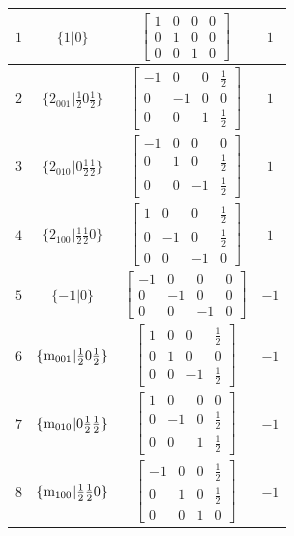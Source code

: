 \documentclass[fleqn,8pt]{jsarticle}
\begin{document}
\begin{longtable}{cccc}
$ 1 $ & $ \{1|0\} $ & $ \begin{bmatrix} 1 & 0 & 0 & 0 \\ 0 & 1 & 0 & 0 \\ 0 & 0 & 1 & 0 \end{bmatrix} $ & $ 1 $ \\ \hline
$ 2 $ & $ \{2{}_{001}|\frac{1}{2} 0 \frac{1}{2}\} $ & $ \begin{bmatrix} -1 & 0 & 0 & \frac{1}{2} \\ 0 & -1 & 0 & 0 \\ 0 & 0 & 1 & \frac{1}{2} \end{bmatrix} $ & $ 1 $ \\ \hline
$ 3 $ & $ \{2{}_{010}|0 \frac{1}{2} \frac{1}{2}\} $ & $ \begin{bmatrix} -1 & 0 & 0 & 0 \\ 0 & 1 & 0 & \frac{1}{2} \\ 0 & 0 & -1 & \frac{1}{2} \end{bmatrix} $ & $ 1 $ \\ \hline
$ 4 $ & $ \{2{}_{100}|\frac{1}{2} \frac{1}{2} 0\} $ & $ \begin{bmatrix} 1 & 0 & 0 & \frac{1}{2} \\ 0 & -1 & 0 & \frac{1}{2} \\ 0 & 0 & -1 & 0 \end{bmatrix} $ & $ 1 $ \\ \hline
$ 5 $ & $ \{-1|0\} $ & $ \begin{bmatrix} -1 & 0 & 0 & 0 \\ 0 & -1 & 0 & 0 \\ 0 & 0 & -1 & 0 \end{bmatrix} $ & $ -1 $ \\ \hline
$ 6 $ & $ \{{\rm m}_{001}|\frac{1}{2} 0 \frac{1}{2}\} $ & $ \begin{bmatrix} 1 & 0 & 0 & \frac{1}{2} \\ 0 & 1 & 0 & 0 \\ 0 & 0 & -1 & \frac{1}{2} \end{bmatrix} $ & $ -1 $ \\ \hline
$ 7 $ & $ \{{\rm m}_{010}|0 \frac{1}{2} \frac{1}{2}\} $ & $ \begin{bmatrix} 1 & 0 & 0 & 0 \\ 0 & -1 & 0 & \frac{1}{2} \\ 0 & 0 & 1 & \frac{1}{2} \end{bmatrix} $ & $ -1 $ \\ \hline
$ 8 $ & $ \{{\rm m}_{100}|\frac{1}{2} \frac{1}{2} 0\} $ & $ \begin{bmatrix} -1 & 0 & 0 & \frac{1}{2} \\ 0 & 1 & 0 & \frac{1}{2} \\ 0 & 0 & 1 & 0 \end{bmatrix} $ & $ -1 $ \\
\end{longtable}
\end{document}
